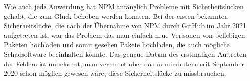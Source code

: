 Wie auch jede Anwendung hat NPM anfänglich Probleme mit Sicherheitslücken gehabt, die zum Glück behoben werden konnten. Bei der ersten bekannten Sicherheitslücke, die nach der Übernahme von NPM durch GitHub im Jahr 2021 aufgetreten ist, war das Problem das man einfach neue Verisonen von beliebigen Paketen hochladen und somit gesehen Pakete hochladen, die auch mögliche Schadsoftware beeinhalten könnte. Das genaue Datum des erstmaligen Auftreten des Fehlers ist unbekannt, man vermutet aber das es mindestens seit September 2020 schon möglich gewesen wäre, diese Sicherheitslücke zu missbrauchen. \cite{NPMSecurity}



